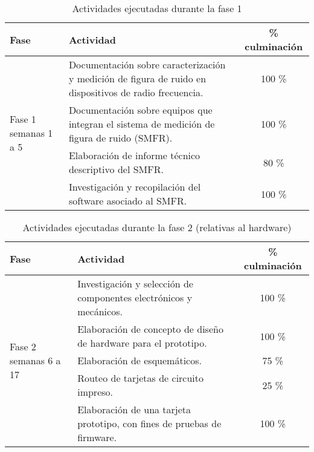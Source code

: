 \documentclass[paper=letter,oneside,fontsize=12pt, parskip=full]{article}
\begin{document}
	\begin{table}[h!]
		\begin{tabularx}{\textwidth}{p{}p{}c}
			\toprule
			{Fase} & 
			{Actividad} & 
			{\% culminación} \\
			\midrule
			\multirow{4}{0.15\textwidth}{Fase 1 \newline \small semanas 1 a 5} &
			Documentación sobre caracterización y medición de figura de ruido en dispositivos de radio frecuencia. & 100 \% \\
			& Documentación sobre equipos que integran el sistema de medición de figura de ruido (SMFR). & 100 \% \\
			& Elaboración de informe técnico descriptivo del SMFR. & 80 \% \\
			& Investigación y recopilación del software asociado al SMFR. & 100 \% \\
			\bottomrule		
		\end{tabularx}
		\caption{Actividades ejecutadas durante la fase 1}
	\end{table}

	\begin{table}[h!]
		\begin{tabularx}{\textwidth}{p{}p{}c}
			\toprule
			{Fase} & 
			{Actividad} & 
			{\% culminación} \\
			\midrule
			\multirow{5}{0.15\textwidth}{Fase 2 \newline \small semanas 6 a 17} &
			Investigación y selección de componentes electrónicos y mecánicos. & 100 \% \\
			& Elaboración de concepto de diseño de hardware para el prototipo. & 100 \% \\
			& Elaboración de esquemáticos. & 75 \% \\
			& Routeo de tarjetas de circuito impreso. & 25 \% \\	
			& Elaboración de una tarjeta prototipo, con fines de pruebas de firmware. & 100 \% \\
			\bottomrule			
		\end{tabularx}
		\caption{Actividades ejecutadas durante la fase 2 (relativas al hardware)}
	\end{table}
\end{document}
